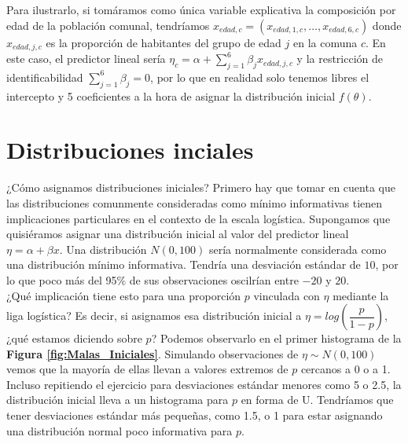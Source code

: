 Para ilustrarlo, si tomáramos como única variable explicativa la composición por edad de la población comunal, tendríamos $x_{edad,c}=(x_{edad,1,c}, \dots, x_{edad,6,c})$ donde $x_{edad,j,c}$ es la proporción de habitantes del grupo de edad $j$ en la comuna $c$. En este caso, el predictor lineal sería $\eta_c = \alpha + \sum\limits_{j=1}^6 \beta_j x_{edad,j,c}$ y la restricción de identificabilidad $\sum\limits_{j=1}^{6}\beta_j=0$, por lo que en realidad solo tenemos libres el intercepto y 5 coeficientes a la hora de asignar la distribución inicial $f(\theta)$. 

\section{Distribuciones inciales} \label{Secc_Iniciales}

¿Cómo asignamos distribuciones iniciales? Primero hay que tomar en cuenta que las distribuciones comunmente consideradas como mínimo informativas tienen implicaciones particulares en el contexto de la escala logística. Supongamos que quisiéramos asignar una distribución inicial al valor del predictor lineal $\eta = \alpha + \beta x$. Una distribución $N(0,100)$ sería normalmente considerada como una distribución mínimo informativa. Tendría una desviación estándar de $10$, por lo que poco más del 95\% de sus observaciones oscilrían entre $-20$ y $20$.\\ 

¿Qué implicación tiene esto para una proporción $p$ vinculada con $\eta$ mediante la liga logística? Es decir, si asignamos esa distribución inicial a $\eta=log\left(\dfrac{p}{1-p}\right)$, ¿qué estamos diciendo sobre $p$? Podemos observarlo en el primer histograma de la \textbf{Figura \ref{fig:Malas_Iniciales}}. Simulando observaciones de $\eta\sim N(0,100)$ vemos que la mayoría de ellas llevan a valores extremos de $p$ cercanos a 0 o a 1. Incluso repitiendo el ejercicio para desviaciones estándar menores como 5 o 2.5, la distribución inicial lleva a un histograma para $p$ en forma de U. Tendríamos que tener desviaciones estándar más pequeñas, como 1.5, o 1 para estar asignando una distribución normal poco informativa para $p$.\\ 

